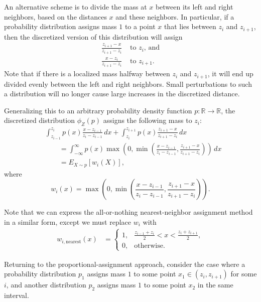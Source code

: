 \documentclass[11pt]{article}
\theoremstyle{definition}
\begin{document}
An alternative scheme is to divide the mass at $x$ between its left and right neighbors, based on the distances $x$ and these neighbors.  In particular, if a probability distribution assigns mass $1$ to a point $x$ that lies between $z_i$ and $z_{i+1}$, then the discretized version of this distribution will assign
\begin{align*}
\frac{z_{i+1}-x}{z_{i+1}-z_i} & \text{ to $z_i$, and} \\
\frac{x-z_i}{z_{i+1}-z_i}     & \text{ to $z_{i+1}$.}
\end{align*}
Note that if there is a localized mass halfway between $z_i$ and $z_{i+1}$, it will end up divided evenly between the left and right neighbors.  Small perturbations to such a distribution will no longer cause large increases in the discretized distance.

Generalizing this to an arbitrary probability density function $p : \mathbb R \to \mathbb R$, the discretized distribution $\phi_Z(p)$ assigns the following mass to $z_i$:
\begin{align*}
& \int_{z_{i-1}}^{z_i} p(x) \frac{x-z_{i-1}}{z_i-z_{i-1}} \, dx
+ \int_{z_i}^{z_{i+1}} p(x) \frac{z_{i+1}-x}{z_{i+1}-z_i} \, dx \\
&\qquad =
\int_{-\infty}^{\infty} p(x) \max\left(0, \min \left(
  \frac{x-z_{i-1}}{z_i-z_{i-1}},
  \frac{z_{i+1}-x}{z_{i+1}-z_i}
\right)\right) \, dx \\
&\qquad =
E_{X \sim p}[w_i(X)],
\end{align*}
where
\[
w_i(x) = \max\left(0, \min \left(
  \frac{x-z_{i-1}}{z_i-z_{i-1}},
  \frac{z_{i+1}-x}{z_{i+1}-z_i}
\right)\right).
\]

Note that we can express the all-or-nothing nearest-neighbor assignment method in a similar form, except we must replace $w_i$ with
\begin{align*}
w_{i,\mathrm{nearest}}(x)
&=
\begin{cases}
1, & \frac{z_{i-1} + z_i}{2} < x < \frac{z_i + z_{i+1}}{2}, \\
0, & \text{otherwise}.
\end{cases}
\end{align*}

Returning to the proportional-assignment approach, consider the case where a probability distribution $p_1$ assigns mass $1$ to some point $x_1 \in (z_i, z_{i+1})$ for some $i$, and another distribution $p_2$ assigns mass $1$ to some point $x_2$ in the same interval.
\end{document}
